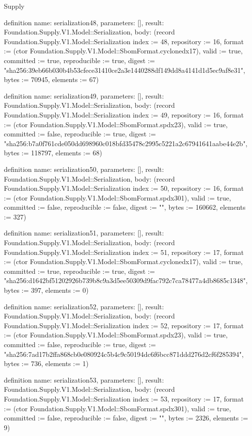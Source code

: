\begin{lexlean}{Supply}
\begin{semanticmodule}
definition{
  name: serialization48,
  parameters: [],
  result: Foundation.Supply.V1.Model::Serialization,
  body: (record Foundation.Supply.V1.Model::Serialization {index := 48, repository := 16, format := (ctor Foundation.Supply.V1.Model::SbomFormat.cyclonedx17), valid := true, committed := true, reproducible := true, digest := "sha256:39eb66b030b4b53cfece31410ce2a3e1440288df149dd8a4141d1d5ec9af8e31", bytes := 70945, elements := 67})
}

definition{
  name: serialization49,
  parameters: [],
  result: Foundation.Supply.V1.Model::Serialization,
  body: (record Foundation.Supply.V1.Model::Serialization {index := 49, repository := 16, format := (ctor Foundation.Supply.V1.Model::SbomFormat.spdx23), valid := true, committed := false, reproducible := true, digest := "sha256:b7a0f761cde050dd698960c018bfd35478c2995c5221a2c67941641aabe44e2b", bytes := 118797, elements := 68})
}

definition{
  name: serialization50,
  parameters: [],
  result: Foundation.Supply.V1.Model::Serialization,
  body: (record Foundation.Supply.V1.Model::Serialization {index := 50, repository := 16, format := (ctor Foundation.Supply.V1.Model::SbomFormat.spdx301), valid := true, committed := false, reproducible := false, digest := "", bytes := 160662, elements := 327})
}

definition{
  name: serialization51,
  parameters: [],
  result: Foundation.Supply.V1.Model::Serialization,
  body: (record Foundation.Supply.V1.Model::Serialization {index := 51, repository := 17, format := (ctor Foundation.Supply.V1.Model::SbomFormat.cyclonedx17), valid := true, committed := true, reproducible := true, digest := "sha256:d1642bf51202926b739b8c9a3d5ee50309d9fac792c7ca78477a4db8685c1348", bytes := 397, elements := 0})
}

definition{
  name: serialization52,
  parameters: [],
  result: Foundation.Supply.V1.Model::Serialization,
  body: (record Foundation.Supply.V1.Model::Serialization {index := 52, repository := 17, format := (ctor Foundation.Supply.V1.Model::SbomFormat.spdx23), valid := true, committed := false, reproducible := true, digest := "sha256:7ad17b2ffa868cb0e080924c5b4c9c50194dc6f6bcc871ddd276d2cf6f285394", bytes := 736, elements := 1})
}

definition{
  name: serialization53,
  parameters: [],
  result: Foundation.Supply.V1.Model::Serialization,
  body: (record Foundation.Supply.V1.Model::Serialization {index := 53, repository := 17, format := (ctor Foundation.Supply.V1.Model::SbomFormat.spdx301), valid := true, committed := false, reproducible := false, digest := "", bytes := 2326, elements := 9})
}


\end{semanticmodule}
\end{lexlean}
